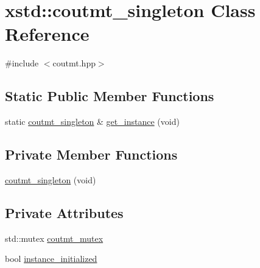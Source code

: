 \hypertarget{classxstd_1_1coutmt__singleton}{\section{xstd\-:\-:coutmt\-\_\-singleton Class Reference}
\label{classxstd_1_1coutmt__singleton}
}


{\ttfamily \#include $<$coutmt.\-hpp$>$}

\subsection*{Static Public Member Functions}
\begin{DoxyCompactItemize}
\item 
static \hyperlink{classxstd_1_1coutmt__singleton}{coutmt\-\_\-singleton} \& \hyperlink{classxstd_1_1coutmt__singleton_a0c478170b82e253a79c51160fe7049a2}{get\-\_\-instance} (void)
\end{DoxyCompactItemize}
\subsection*{Private Member Functions}
\begin{DoxyCompactItemize}
\item 
\hyperlink{classxstd_1_1coutmt__singleton_afbf08c934b4a1c80bd18669f34456a7c}{coutmt\-\_\-singleton} (void)
\end{DoxyCompactItemize}
\subsection*{Private Attributes}
\begin{DoxyCompactItemize}
\item 
std\-::mutex \hyperlink{classxstd_1_1coutmt__singleton_a7e9a38b4f7d555718afbc75aaa4de628}{coutmt\-\_\-mutex}
\item 
bool \hyperlink{classxstd_1_1coutmt__singleton_aa00e04e689ddfbf12fff7383b465cad2}{instance\-\_\-initialized}
\end{DoxyCompactItemize}
